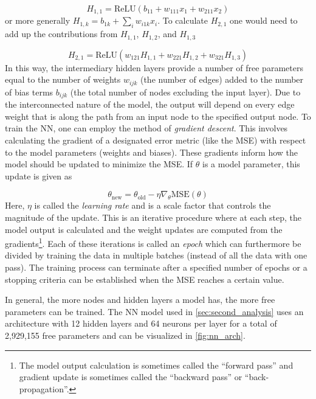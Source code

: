 \begin{equation}
	H_{1,1} = \text{ReLU}(b_{11} + w_{111} x_1 + w_{211} x_2)
\end{equation}
or more generally $H_{1,k} = b_{1k} + \sum_{i} w_{i1k} x_i$. To calculate $H_{2,1}$ one would need to add up the contributions from $H_{1,1}$, $H_{1, 2}$, and $H_{1, 3}$

\begin{equation}
	H_{2,1} = \text{ReLU}(w_{121} H_{1,1} + w_{221} H_{1,2} +w_{321} H_{1,3})
\end{equation}
In this way, the intermediary hidden layers provide a number of free parameters equal to the number of weights $w_{ijk}$ (the number of edges) added to the number of bias terms $b_{ijk}$ (the total number of nodes excluding the input layer). Due to the interconnected nature of the model, the output will depend on every edge weight that is along the path from an input node to the specified output node. To train the \gls{NN}, one can employ the method of \emph{gradient descent}. This involves calculating the gradient of a designated error metric (like the \gls{MSE}) with respect to the model parameters (weights and biases). These gradients inform how the model should be updated to minimize the \gls{MSE}. If $\theta$ is a model parameter, this update is given as 

\begin{equation}
	\theta_\text{new} = \theta_\text{old} - \eta \nabla_\theta \text{MSE}(\theta) \label{eq:gradient_descent}
\end{equation}
Here, $\eta$ is called the \emph{learning rate} and is a scale factor that controls the magnitude of the update. This is an iterative procedure where at each step, the model output is calculated and the weight updates are computed from the gradients\footnote{The model output calculation is sometimes called the ``forward pass'' and gradient update is sometimes called the ``backward pass'' or ``back-propagation''.}. Each of these iterations is called an \emph{epoch} which can furthermore be divided by training the data in multiple batches (instead of all the data with one pass). The training process can terminate after a specified number of epochs or a stopping criteria can be established when the \gls{MSE} reaches a certain value.

In general, the more nodes and hidden layers a model has, the more free parameters can be trained. The \gls{NN} model used in \autoref{sec:second_analysis} uses an architecture with 12 hidden layers and 64 neurons per layer for a total of 2,929,155 free parameters and can be visualized in \autoref{fig:nn_arch}.

